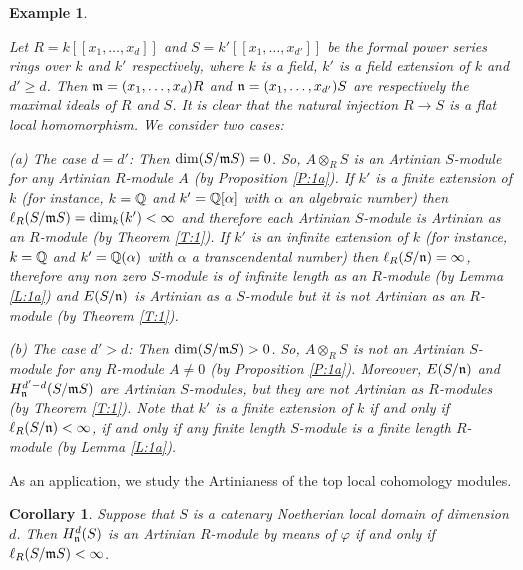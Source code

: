 \documentclass[a4papersize]{article}
\newtheorem{corollary}[theorem]{Corollary}
\newtheorem{example}[theorem]{Example}
\begin{document}
\begin{example} \label{E:1a} {\rm  Let $R=k[[x_1, \ldots , x_d]]$ and $S=k'[[x_1, \ldots , x_{d'}]]$ be  the formal power series rings over  $k$ and  $k'$ respectively, where  $k$ is a field, $k'$ is a field extension of $k$ and $d'\geq d$. Then $\frak m=(x_1, \ldots , x_d)R$ and $\frak n=(x_1, \ldots , x_{d'})S$ are respectively the maximal ideals of $R$ and $S$.  It is clear that the natural injection $R\rightarrow S$ is a flat local homomorphism. We consider two cases:

(a) {\it The case $d=d'$}: Then $\dim(S/\frak mS)=0$. So, $A\otimes_RS$ is an Artinian $S$-module for any Artinian $R$-module $A$ (by Proposition \ref{P:1a}). If $k'$ is a finite extension of $k$ (for instance, $k=\Bbb Q$ and $k'=\Bbb Q[\alpha]$ with $\alpha$ an algebraic number) then $\ell_R(S/\frak mS)=\dim_k(k')<\infty$ and therefore each Artinian $S$-module is Artinian as an $R$-module (by Theorem \ref{T:1}). If $k'$ is an infinite extension of $k$ (for instance, $k=\Bbb Q$ and $k'=\Bbb Q(\alpha)$ with $\alpha$ a transcendental number) then $\ell_R(S/\frak n)=\infty$, therefore any non zero $S$-module is of infinite length as an $R$-module (by Lemma \ref{L:1a}) and $E(S/\frak n)$ is Artinian as a $S$-module but it is not Artinian as an $R$-module (by Theorem \ref{T:1}).

(b) {\it The case $d'>d$}: Then $\dim (S/\frak mS)>0$. So, $A\otimes_RS$ is not an Artinian $S$-module for any $R$-module $A\neq 0$ (by Proposition \ref{P:1a}). Moreover, $E(S/\frak n)$ and $H^{d'-d}_{\frak n}(S/\frak mS)$ are Artinian $S$-modules, but they are not Artinian as  $R$-modules (by Theorem \ref{T:1}). Note that $k'$ is a finite extension of $k$ if and only if $\ell_R(S/\frak n)<\infty$, if and only if any finite length  $S$-module is a finite length $R$-module (by Lemma \ref{L:1a}).}
\end{example}

As an application,  we study the Artinianess of the top local cohomology modules.

\begin{corollary} \label{C:1} Suppose that $S$ is a catenary Noetherian local domain of dimension $d$. Then $H^d_{\frak n}(S)$ is an Artinian $R$-module  by means of $\varphi$ if and only if $\ell_R(S/\frak mS)<\infty$.
\end{corollary}
\end{document}

